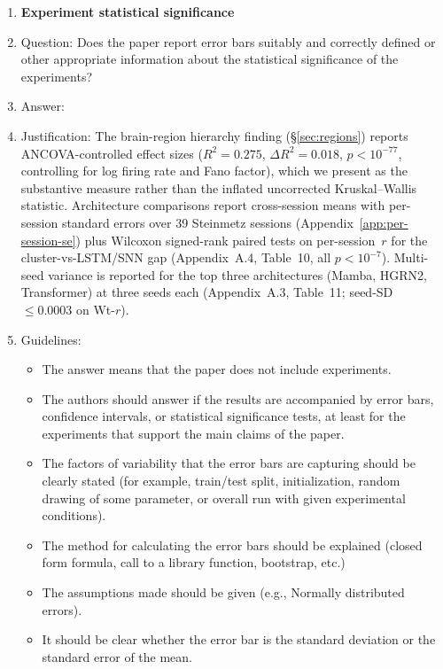 \begin{enumerate}
\item {\bf Experiment statistical significance}
    \item[] Question: Does the paper report error bars suitably and correctly defined or other appropriate information about the statistical significance of the experiments?
    \item[] Answer: \answerYes{}
    \item[] Justification: The brain-region hierarchy finding
      (\S\ref{sec:regions}) reports ANCOVA-controlled effect sizes
      ($R^{2}{=}0.275$, $\Delta R^{2}{=}0.018$, $p < 10^{-77}$,
      controlling for log firing rate and Fano factor), which we
      present as the substantive measure rather than the inflated
      uncorrected Kruskal--Wallis statistic.  Architecture comparisons
      report cross-session means with per-session standard errors over
      39 Steinmetz sessions (Appendix~\ref{app:per-session-se}) plus
      Wilcoxon signed-rank paired tests on per-session~$r$ for the
      cluster-vs-LSTM/SNN gap (Appendix~A.4, Table~10, all
      $p<10^{-7}$).  Multi-seed variance is reported for the top three
      architectures (Mamba, HGRN2, Transformer) at three seeds each
      (Appendix~A.3, Table~11; seed-SD ${\leq}0.0003$ on Wt-$r$).
    \item[] Guidelines:
    \begin{itemize}
        \item The answer \answerNA{} means that the paper does not include experiments.
        \item The authors should answer \answerYes{} if the results are accompanied by error bars, confidence intervals, or statistical significance tests, at least for the experiments that support the main claims of the paper.
        \item The factors of variability that the error bars are capturing should be clearly stated (for example, train/test split, initialization, random drawing of some parameter, or overall run with given experimental conditions).
        \item The method for calculating the error bars should be explained (closed form formula, call to a library function, bootstrap, etc.)
        \item The assumptions made should be given (e.g., Normally distributed errors).
        \item It should be clear whether the error bar is the standard deviation or the standard error of the mean.

\end{itemize}
\end{enumerate}
